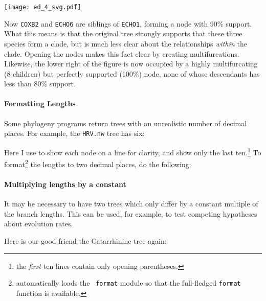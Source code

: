 
\begin{center}
\texttt{[image: ed\_4\_svg.pdf]}
\end{center}

\noindent{}Now \texttt{COXB2} and \texttt{ECHO6} are siblings of
\texttt{ECHO1}, forming a node with 90\% support. What this means is that the
original tree strongly supports that these three species form a clade, but is
much less clear about the relationships \emph{within} the clade. Opening the
nodes makes this fact clear by creating multifurcations. Likewise, the lower
right of the figure is now occupied by a highly multifurcating (8 children) but
perfectly supported (100\%) node, none of whose descendants has less than 80\%
support.


\paragraph{Formatting Lengths} 

\noindent{}Some phylogeny programs return \nw{} trees with an unrealistic number
of decimal places. For example, the \texttt{HRV.nw} tree has six:


\begin{samepage}

\end{samepage}

\noindent{}Here I use \nwindent{} to show each node on a line for clarity, and
show only the last ten.\footnote{the \emph{first} ten lines contain only
opening parentheses.} To format\footnote{\sched{} automatically loads the {\tt
format} module so that the full-fledged {\tt format} function is available.}
the lengths to two decimal places, do the following:


\begin{samepage}

\end{samepage}

\begin{samepage}
\paragraph{Multiplying lengths by a constant}

It may be necessary to have two trees which only differ by a constant multiple
of the branch lengths. This can be used, for example, to test competing
hypotheses about evolution rates.
\end{samepage}
Here is our good friend the Catarrhinine tree again:

